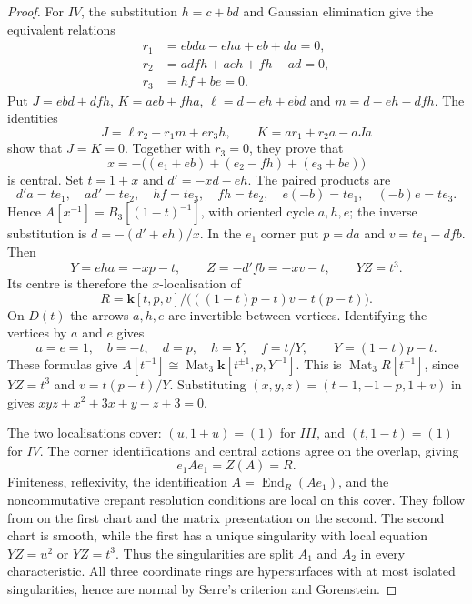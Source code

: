 \documentclass[a4paper]{amsart}
\newcommand{\kk}{\mathbf{k}}
\numberwithin{equation}{section}
\begin{document}
\begin{proof}
For $IV$, the substitution $h=c+bd$ and Gaussian elimination
give the equivalent relations
\begin{equation}\label{eq:IV-centre-relations}
\begin{split}
 r_1&=ebda-eha+eb+da=0,\\
 r_2&=adfh+aeh+fh-ad=0,\\
 r_3&=hf+be=0.
\end{split}
\end{equation}
Put $J=ebd+dfh$, $K=aeb+fha$,
$\ell=d-eh+ebd$ and $m=d-eh-dfh$. The identities
\[
 J=\ell r_2+r_1m+er_3h,\qquad
 K=ar_1+r_2a-aJa
\]
show that $J=K=0$. Together with $r_3=0$, they prove that
\[
 x=-\bigl((e_1+eb)+(e_2-fh)+(e_3+be)\bigr)
\]
is central. Set $t=1+x$ and $d'=-xd-eh$. The paired products are
\[
 d'a=te_1,\quad ad'=te_2,\quad
 hf=te_3,\quad fh=te_2,\quad
 e(-b)=te_1,\quad(-b)e=te_3.
\]
Hence $A[x^{-1}]=B_3[(1-t)^{-1}]$, with oriented cycle $a,h,e$;
the inverse substitution is $d=-(d'+eh)/x$. In the $e_1$ corner put
$p=da$ and $v=te_1-dfb$. Then
\[
 Y=eha=-xp-t,\qquad Z=-d'fb=-xv-t,\qquad YZ=t^3.
\]
Its centre is therefore the $x$-localisation of
\begin{equation}\label{eq:IV-centre-chart}
 R=\kk[t,p,v]/\bigl(((1-t)p-t)v-t(p-t)\bigr).
\end{equation}
On $D(t)$ the arrows $a,h,e$ are invertible between vertices.
Identifying the vertices by $a$ and $e$ gives
\[
 a=e=1,\quad b=-t,\quad d=p,\quad h=Y,
 \quad f=t/Y,\qquad Y=(1-t)p-t.
\]
These formulas give
$A[t^{-1}]\cong\operatorname{Mat}_3
\kk[t^{\pm1},p,Y^{-1}]$.
This is $\operatorname{Mat}_3R[t^{-1}]$, since $YZ=t^3$ and
$v=t(p-t)/Y$. Substituting $(x,y,z)=(t-1,-1-p,1+v)$ in
 gives
$xyz+x^2+3x+y-z+3=0$.

The two localisations cover: $(u,1+u)=(1)$ for $III$, and
$(t,1-t)=(1)$ for $IV$. The corner identifications and central
actions agree on the overlap, giving
\[
 e_1Ae_1=Z(A)=R.
\]
Finiteness, reflexivity, the identification
$A=\operatorname{End}_R(Ae_1)$, and the noncommutative crepant
resolution conditions are local on this cover. They follow from
 on the first chart and the matrix
presentation on the second. The second chart is smooth, while
the first has a unique singularity with local equation $YZ=u^2$
or $YZ=t^3$. Thus the singularities are split $A_1$ and $A_2$ in
every characteristic. All three coordinate rings are hypersurfaces
with at most isolated singularities, hence are normal by Serre's
criterion and Gorenstein.
\end{proof}
\end{document}
